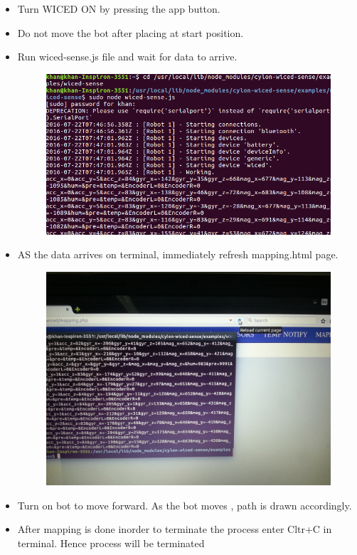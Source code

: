 \documentclass[11pt,a4paper]{article}
\begin{document}
\begin{itemize}
	 
	 \newpage
	\item Turn WICED ON by pressing the app button.
	 \item Do not move the bot after placing at start position.
	 \item Run wiced-sense.js file and wait for data to arrive.
	 
	 	\begin{figure}[h]
    \centering
	\includegraphics[scale=0.5]{data_arraives.png}
	\end{figure}
	
	\item AS the data arrives on terminal, immediately refresh mapping.html page.
	
	
		\begin{figure}[h]
    \centering
	\includegraphics[scale=0.1]{20160722_195821.jpg}
	\end{figure}
	
	\newpage
	\item Turn on bot to move forward. As the bot moves , path is drawn accordingly.
	
	\item After mapping is done inorder to terminate the process enter Cltr+C in terminal. Hence process will be terminated
	 	 \end{itemize}


	
\end{document}
